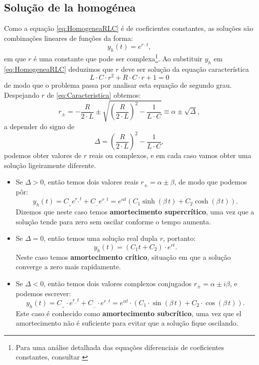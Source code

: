 \subsection{Solução de la homogénea} \label{solucionHomogenea}
Como a equação \eqref{eq:HomogeneaRLC} é de coeficientes constantes, as soluções são combinações lineares de funções da forma:
\[
y_h(t) = e^{r\cdot t},
\]
em que $r$ é uma constante que pode ser complexa\footnote{Para uma análise detalhada das equações diferenciais de coeficientes constantes, consultar \cite[p.~226]{DiPrima}}. Ao substituir $y_h$ em \eqref{eq:HomogeneaRLC} deduzimos que $r$ deve ser solução da equação característica
\begin{equation}
  \label{eq:Característica}
  L\cdot C\cdot r^2 + R\cdot C\cdot r + 1 = 0
\end{equation}
de modo que o problema passa por analisar esta equação de segundo grau. Despejando $r$ de \eqref{eq:Caracteristica} obtemos:
\[
r_\pm = -\frac{R}{2\cdot L} \pm \sqrt{\left( \frac{R}{2\cdot L} \right)^2 - \frac{1}{L\cdot C}} \equiv \alpha \pm \sqrt{\Delta},
\]
a depender do signo de
\[
\Delta = \left( \frac{R}{2\cdot L} \right)^2 - \frac{1}{L\cdot C},
\]
podemos obter valores de $r$ reais ou complexos, e em cada caso vamos obter uma solução ligeiramente diferente.
\begin{itemize}
  \item Se $\Delta > 0$, então temos dois valores reais $r_{\pm}=\alpha \pm \beta $, de modo que podemos pôr:
\[
y_h(t) = C_{\!_+} e^{r_{\!_+} t} + C_{\!_-} e^{r_{\!_-}t} = e^{\alpha t}\left(C_1\sinh(\beta\, t) + C_2 \cosh(\beta\, t)\right).
\]
Dizemos que neste caso temos \textbf{amortecimento supercrítico}, uma vez que a solução tende para zero sem oscilar conforme o tempo aumenta.
  \item Se $\Delta = 0$, então temos uma solução real dupla $r$, portanto:
\[
y_h(t) = (C_1t+C_2)\cdot e^{rt}.
\]
Neste caso temos \textbf{amortecimento crítico}, situação em que a solução converge a zero mais rapidamente.
  \item Se $\Delta < 0$, então temos dois valores complexos conjugados $r_{\pm}=\alpha \pm i\beta$, e podemos escrever:
\[
y_h(t) = C_{\!_+} \cdot e^{r_{\!_+}  t} + C_{\!_-}\cdot  e^{r_{\!_-} t} = e^{\alpha t}\cdot \left(C_1\cdot \sin(\beta\, t) + C_2 \cdot \cos(\beta\, t)\right).
\]
Este caso é conhecido como \textbf{amortecimento subcrítico}, uma vez que el amortecimento não é suficiente para evitar que a solução fique oscilando.
\end{itemize}


